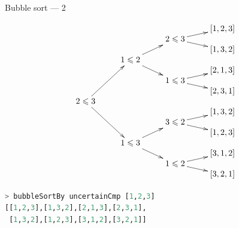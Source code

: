 \documentclass[handout]{beamer}
\def\le{\leqslant}
\begin{document}
\begin{frame}[fragile]{Bubble sort --- 2}

\vspace{-4ex}

$$\xymatrix@R-2.2pc{
                             &                          &                        & [1,2,3] \\
                             &                          & 2 \le 3 \ar[ur]\ar[dr] &         \\
                             &                          &                        & [1,3,2] \\
                             & 1 \le 2 \ar[uur]\ar[ddr] &                        &         \\
                             &                          &                        & [2,1,3] \\
                             &                          & 1 \le 3 \ar[ur]\ar[dr] &         \\
                             &                          &                        & [2,3,1] \\
2 \le 3 \ar[uuuur]\ar[ddddr] &                          &                        &         \\
                             &                          &                        & [1,3,2] \\
                             &                          & 3 \le 2 \ar[ur]\ar[dr] &         \\
                             &                          &                        & [1,2,3] \\
                             & 1 \le 3 \ar[uur]\ar[ddr] &                        &         \\
                             &                          &                        & [3,1,2] \\
                             &                          & 1 \le 2 \ar[ur]\ar[dr] &         \\
                             &                          &                        & [3,2,1] \\
}$$

\vspace{-3ex}

\begin{lstlisting}[language=Haskell]
> bubbleSortBy uncertainCmp [1,2,3]
[[1,2,3],[1,3,2],[2,1,3],[2,3,1],
 [1,3,2],[1,2,3],[3,1,2],[3,2,1]]
\end{lstlisting}

\end{frame}
\end{document}
